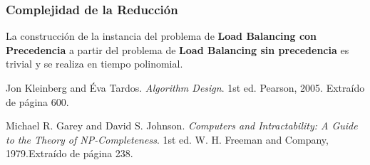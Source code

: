 \documentclass{report}
\begin{document}
	\subsubsection*{Complejidad de la Reducción}
	
	La construcción de la instancia del problema de \textbf{Load Balancing con Precedencia} a partir del problema de \textbf{Load Balancing sin precedencia} es trivial y se realiza en tiempo polinomial.
	
	
	
	
	\begin{thebibliography}{9}
		Jon Kleinberg and Éva Tardos.
		\textit{Algorithm Design}.
		1st ed. Pearson, 2005. Extraído de página 600.

		Michael R. Garey and David S. Johnson.
		\textit{Computers and Intractability: A Guide to the Theory of NP-Completeness}.
		1st ed. W. H. Freeman and Company, 1979.Extraído de página 238.
	\end{thebibliography}
\end{document}
